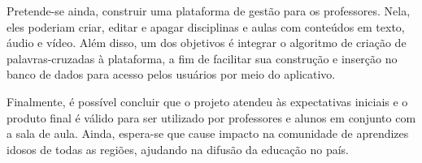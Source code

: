 Pretende-se ainda, construir uma plataforma de gestão para os professores. Nela, eles poderiam criar, editar e apagar disciplinas e aulas com conteúdos em texto, áudio e vídeo. Além disso, um dos objetivos é integrar o algoritmo de criação de palavras-cruzadas à plataforma, a fim de facilitar sua construção e inserção no banco de dados para acesso pelos usuários por meio do aplicativo.

Finalmente, é possível concluir que o projeto atendeu às expectativas iniciais e o produto final é válido para ser utilizado por professores e alunos em conjunto com a sala de aula. 
Ainda, espera-se que cause impacto na comunidade de aprendizes idosos de todas as regiões, ajudando na difusão da educação no país.
